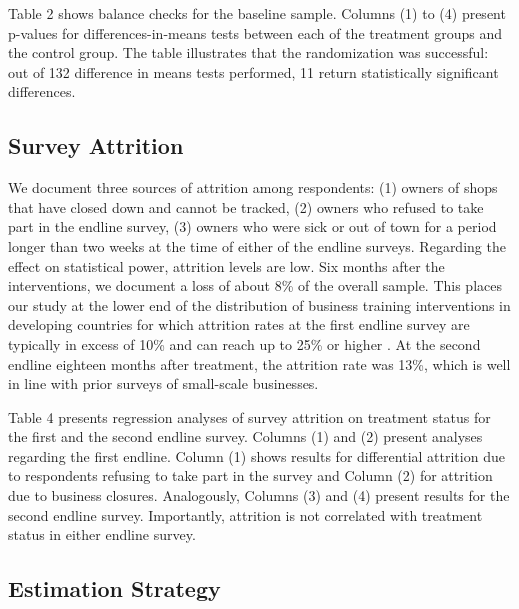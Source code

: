 \documentclass[11.5pt]{article}
\begin{document}
Table 2 shows balance checks for the baseline sample. Columns (1) to (4) present p-values for differences-in-means tests between each of the treatment groups and the control group. The table illustrates that the randomization was successful: out of 132 difference in means tests performed, 11 return statistically significant differences.

\subsection{Survey Attrition}

We document three sources of attrition among respondents: (1) owners of shops that have closed down and cannot be tracked, (2) owners who refused to take part in the endline survey, (3) owners who were sick or out of town for a period longer than two weeks at the time of either of the endline surveys. Regarding the effect on statistical power, attrition levels are low. Six months after the interventions, we document a loss of about 8\% of the overall sample. This places our study at the lower end of the distribution of business training interventions in developing countries for which attrition rates at the first endline survey are typically in excess of 10\% and can reach up to 25\% or higher \citep[for a review, see][]{McKenzie2014}. At the second endline eighteen months after treatment, the attrition rate was 13\%, which is well in line with prior surveys of small-scale businesses. 

Table 4 presents regression analyses of survey attrition on treatment status for the first and the second endline survey. Columns (1) and (2) present analyses regarding the first endline. Column (1) shows results for differential attrition due to respondents refusing to take part in the survey and Column (2) for attrition due to business closures. Analogously, Columns (3) and (4) present results for the second endline survey. Importantly, attrition is not correlated with treatment status in either endline survey.


\subsection{Estimation Strategy}

\end{document}
